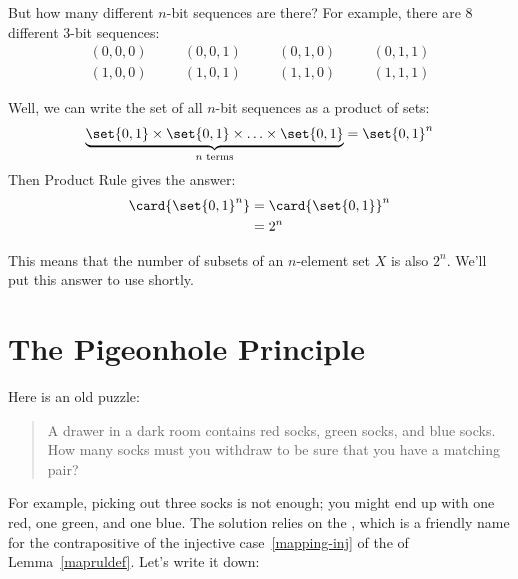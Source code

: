 But how many different $n$-bit sequences are there?  For example,
there are 8 different 3-bit sequences:
%
\[
\begin{array}{ccccccc}
(0,0,0) & \quad & (0,0,1) & \quad & (0,1,0) & \quad & (0,1,1) \\
(1,0,0) & \quad & (1,0,1) & \quad & (1,1,0) & \quad & (1,1,1)
\end{array}
\]

Well, we can write the set of all $n$-bit sequences as a product of
sets:
%
\[
\underbrace{\set{0,1} \times \set{0,1} \times
        \ldots \times \set{0,1}}_{\text{$n$ terms}} = \set{0,1}^n
\]
%
Then Product Rule gives the answer:
%
\begin{align*}
\card{\set{0,1}^n}
    & = \card{\set{0,1}}^n \\
    & = 2^n
\end{align*}

This means that the number of subsets of an $n$-element set $X$ is
also $2^n$.  We'll put this answer to use shortly.


\begin{problems}
\classproblems
{}

\homeworkproblems
{}

\end{problems}

\section{The Pigeonhole Principle}\label{pigeon_hole_sec}

Here is an old puzzle:

\begin{quotation}
A drawer in a dark room contains red socks, green socks, and
blue socks.  How many socks must you withdraw to be sure that you have
a matching pair?
\end{quotation}

For example, picking out three socks is not enough; you might end up with
one red, one green, and one blue.  The solution relies on the
, which is a friendly name for the
contrapositive of the injective case~\ref{mapping-inj} of the 
of Lemma~\ref{mapruldef}.  Let's write it down:

